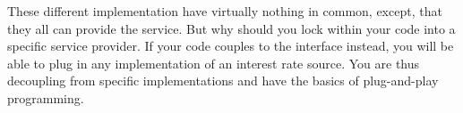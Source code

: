 These different implementation have virtually nothing in common, except, that
they all can provide the service. But why should you lock within your code
into a specific service provider. If your code couples to the interface instead,
you will be able to plug in any implementation of an interest rate source.
You are thus decoupling from specific implementations and have the basics
of plug-and-play programming.


